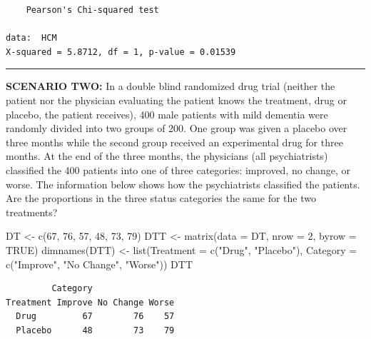 \documentclass[
]{article}
\newenvironment{Shaded}{\begin{snugshade}}{\end{snugshade}}
\newcommand{\AttributeTok}[1]{\textcolor[rgb]{0.77,0.63,0.00}{#1}}
\newcommand{\ConstantTok}[1]{\textcolor[rgb]{0.00,0.00,0.00}{#1}}
\newcommand{\DecValTok}[1]{\textcolor[rgb]{0.00,0.00,0.81}{#1}}
\newcommand{\FunctionTok}[1]{\textcolor[rgb]{0.00,0.00,0.00}{#1}}
\newcommand{\NormalTok}[1]{#1}
\newcommand{\OtherTok}[1]{\textcolor[rgb]{0.56,0.35,0.01}{#1}}
\newcommand{\StringTok}[1]{\textcolor[rgb]{0.31,0.60,0.02}{#1}}
\begin{document}
\begin{verbatim}
    Pearson's Chi-squared test

data:  HCM
X-squared = 5.8712, df = 1, p-value = 0.01539
\end{verbatim}

\begin{center}\rule{0.5\linewidth}{0.5pt}\end{center}

\textbf{SCENARIO TWO:} In a double blind randomized drug trial (neither the patient nor the physician evaluating the patient knows the treatment, drug or placebo, the patient receives), 400 male patients with mild dementia were randomly divided into two groups of 200. One group was given a placebo over three months while the second group received an experimental drug for three months. At the end of the three months, the physicians (all psychiatrists) classified the 400 patients into one of three categories: improved, no change, or worse. The information below shows how the psychiatrists classified the patients. Are the proportions in the three status categories the same for the two treatments?

\begin{Shaded}
\begin{Highlighting}[]
\NormalTok{DT }\OtherTok{\textless{}{-}} \FunctionTok{c}\NormalTok{(}\DecValTok{67}\NormalTok{, }\DecValTok{76}\NormalTok{, }\DecValTok{57}\NormalTok{, }\DecValTok{48}\NormalTok{, }\DecValTok{73}\NormalTok{, }\DecValTok{79}\NormalTok{)}
\NormalTok{DTT }\OtherTok{\textless{}{-}} \FunctionTok{matrix}\NormalTok{(}\AttributeTok{data =}\NormalTok{ DT, }\AttributeTok{nrow =} \DecValTok{2}\NormalTok{, }\AttributeTok{byrow =} \ConstantTok{TRUE}\NormalTok{)}
\FunctionTok{dimnames}\NormalTok{(DTT) }\OtherTok{\textless{}{-}} \FunctionTok{list}\NormalTok{(}\AttributeTok{Treatment =} \FunctionTok{c}\NormalTok{(}\StringTok{"Drug"}\NormalTok{, }\StringTok{"Placebo"}\NormalTok{),}
   \AttributeTok{Category =} \FunctionTok{c}\NormalTok{(}\StringTok{"Improve"}\NormalTok{, }\StringTok{"No Change"}\NormalTok{, }\StringTok{"Worse"}\NormalTok{))}
\NormalTok{DTT}
\end{Highlighting}
\end{Shaded}

\begin{verbatim}
         Category
Treatment Improve No Change Worse
  Drug         67        76    57
  Placebo      48        73    79
\end{verbatim}
\end{document}

